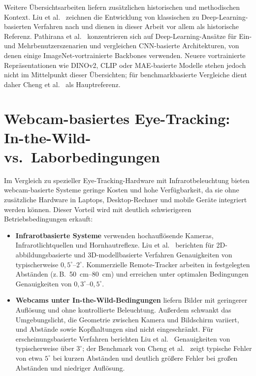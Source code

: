 \documentclass[
  11pt,
  a4paper,
  oneside,
  DIV=12,                 %
  BCOR=8mm,               %
  parskip=half,           %
  headings=normal,
  bibliography=totoc,     %
  listof=totoc            %
]{scrreprt}
\begin{document}
Weitere Übersichtsarbeiten liefern zusätzlichen historischen und methodischen Kontext. Liu et al.~\cite{liu2022beholder} zeichnen die Entwicklung von klassischen zu Deep-Learning-basierten Verfahren nach und dienen in dieser Arbeit vor allem als historische Referenz. Pathirana et al.~\cite{pathirana2022survey} konzentrieren sich auf Deep-Learning-Ansätze für Ein- und Mehrbenutzerszenarien und vergleichen CNN-basierte Architekturen, von denen einige ImageNet-vortrainierte Backbones verwenden. Neuere vortrainierte Repräsentationen wie DINOv2, CLIP oder MAE-basierte Modelle stehen jedoch nicht im Mittelpunkt dieser Übersichten; für benchmarkbasierte Vergleiche dient daher Cheng et al.~\cite{cheng2024review} als Hauptreferenz.

\section{Webcam-basiertes Eye-Tracking: In-the-Wild- vs.\ Laborbedingungen}
\label{sec:webcam}
Im Vergleich zu spezieller Eye-Tracking-Hardware mit Infrarotbeleuchtung bieten webcam-basierte Systeme geringe Kosten und hohe Verfügbarkeit, da sie ohne zusätzliche Hardware in Laptops, Desktop-Rechner und mobile Geräte integriert werden können. Dieser Vorteil wird mit deutlich schwierigeren Betriebsbedingungen erkauft:

\begin{itemize}
  \item \textbf{Infrarotbasierte Systeme} verwenden hochauflösende Kameras, Infrarotlichtquellen und Hornhautreflexe. Liu et al.~\cite{liu2022beholder} berichten für 2D-abbildungsbasierte und 3D-modellbasierte Verfahren Genauigkeiten von typischerweise $0,5^\circ$--$2^\circ$. Kommerzielle Remote-Tracker arbeiten in festgelegten Abständen (z.\,B.\ \SIrange{50}{80}{\centi\metre}) und erreichen unter optimalen Bedingungen Genauigkeiten von $0,3^\circ$--$0,5^\circ$.
  \item \textbf{Webcams unter In-the-Wild-Bedingungen} liefern Bilder mit geringerer Auflösung und ohne kontrollierte Beleuchtung. Außerdem schwankt das Umgebungslicht, die Geometrie zwischen Kamera und Bildschirm variiert, und Abstände sowie Kopfhaltungen sind nicht eingeschränkt. Für erscheinungsbasierte Verfahren berichten Liu et al.~\cite{liu2022beholder} Genauigkeiten von typischerweise über $3^\circ$; der Benchmark von Cheng et al.~\cite{cheng2024review} zeigt typische Fehler von etwa $5^\circ$ bei kurzen Abständen und deutlich größere Fehler bei großen Abständen und niedriger Auflösung.
\end{itemize}
\end{document}
